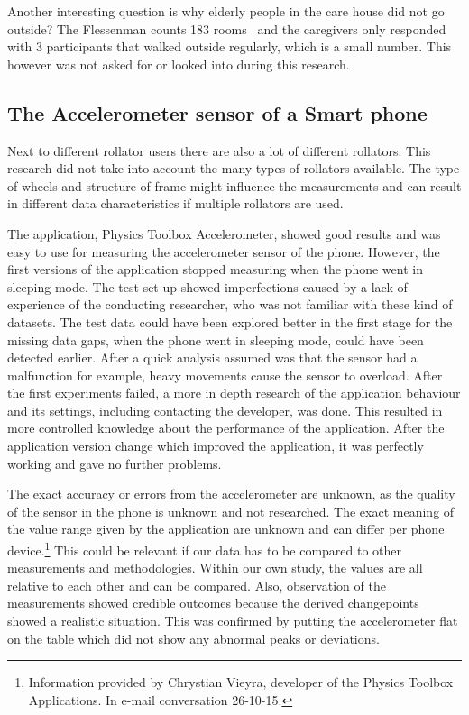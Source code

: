 Another interesting question is why elderly people in the care house did not go outside? The Flessenman counts 183 rooms~\cite{flessenman} and the caregivers only responded with 3 participants that walked outside regularly, which is a small number. This however was not asked for or looked into during this research. 

\subsection{The Accelerometer sensor of a Smart phone}
Next to different rollator users there are also a lot of different rollators. This research did not take into account the many types of rollators available. The type of wheels and structure of frame might influence the measurements and can result in different data characteristics if multiple rollators are used.

The application, Physics Toolbox Accelerometer, showed good results and was easy to use for measuring the accelerometer sensor of the phone. However, the first versions of the application stopped measuring when the phone went in sleeping mode. The test set-up showed imperfections caused by a lack of experience of the conducting researcher, who was not familiar with these kind of datasets. The test data could have been explored better in the first stage for the missing data gaps, when the phone went in sleeping mode, could have been detected earlier. After a quick analysis assumed was that the sensor had a malfunction for example, heavy movements cause the sensor to overload. After the first experiments failed, a more in depth research of the application behaviour and its settings, including contacting the developer, was done. This resulted in more controlled knowledge about the performance of the application. After the application version change which improved the application, it was perfectly working and gave no further problems. 

The exact accuracy or errors from the accelerometer are unknown, as the quality of the sensor in the phone is unknown and not researched. The exact meaning of the value range given by the application are unknown and can differ per phone device.\footnote{Information provided by Chrystian Vieyra, developer of the Physics Toolbox Applications. In e-mail conversation 26-10-15. } This could be relevant if our data has to be compared to other measurements and methodologies. Within our own study, the values are all relative to each other and can be compared. Also, observation of the measurements showed credible outcomes because the derived changepoints showed a realistic situation. This was confirmed by putting the accelerometer flat on the table which did not show any abnormal peaks or deviations. 

